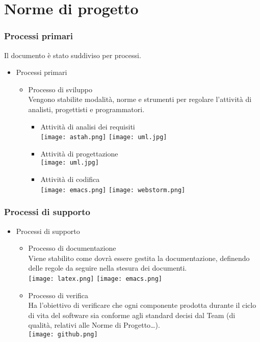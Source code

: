 \section{Norme di progetto}
\begin{frame}
  \frametitle{Processi primari}
  Il documento è stato suddiviso per processi.
  \begin{itemize}
  \item Processi primari
    \begin{itemize}
    \item Processo di sviluppo\\
      Vengono stabilite modalità, norme e strumenti per regolare l'attività di analisti, progettisti e programmatori.
      \begin{itemize}
      \item Attività di analisi dei requisiti\\
        \texttt{[image: astah.png]}
        \texttt{[image: uml.jpg]}
      \item Attività di progettazione\\
        \texttt{[image: uml.jpg]}
      \item Attività di codifica\\
        \texttt{[image: emacs.png]}
        \texttt{[image: webstorm.png]}
      \end{itemize}
    \end{itemize}
  \end{itemize}
\end{frame}

\begin{frame}
  \frametitle{Processi di supporto}
  \begin{itemize}
  \item Processi di supporto
    \begin{itemize}
    \item Processo di documentazione\\
      Viene stabilito come dovrà essere gestita la documentazione, definendo delle regole da seguire nella stesura dei documenti.\\
      \texttt{[image: latex.png]}
      \texttt{[image: emacs.png]}
    \item Processo di verifica\\ Ha l'obiettivo di verificare che ogni componente prodotta durante il ciclo di vita del software sia conforme agli standard decisi dal Team (di qualità, relativi alle Norme di Progetto\dots).\\
      \texttt{[image: github.png]}
    \end{itemize}
  \end{itemize}
\end{frame}

